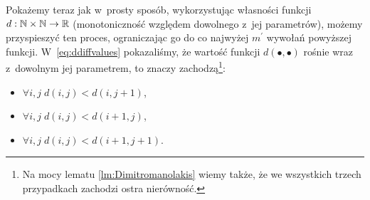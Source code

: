 Pokażemy teraz jak w~prosty sposób, wykorzystując własności funkcji $d: \mathbb{N} \times \mathbb{N} \rightarrow \mathbb{R}$ (monotoniczność względem dowolnego z~jej parametrów), możemy przyspieszyć ten proces, ograniczając go do co najwyżej $m^{\prime}$ wywołań powyższej funkcji. W~\ref{eq:ddiffvalues} pokazaliśmy, że wartość funkcji $d \left( \bullet, \bullet \right)$ rośnie wraz z~dowolnym jej parametrem, to znaczy zachodzą\footnote{Na mocy lematu \ref{lm:Dimitromanolakis} wiemy także, że we wszystkich trzech przypadkach zachodzi ostra nierówność.}:

\begin{itemize}
	\item $\forall i, j \; d \left( i, j \right) < d \left( i, j + 1 \right)$,
	\item $\forall i, j \; d \left( i, j \right) < d \left( i + 1, j \right)$,
	\item $\forall i, j \; d \left( i, j \right) < d \left( i + 1, j + 1 \right)$.
\end{itemize}

